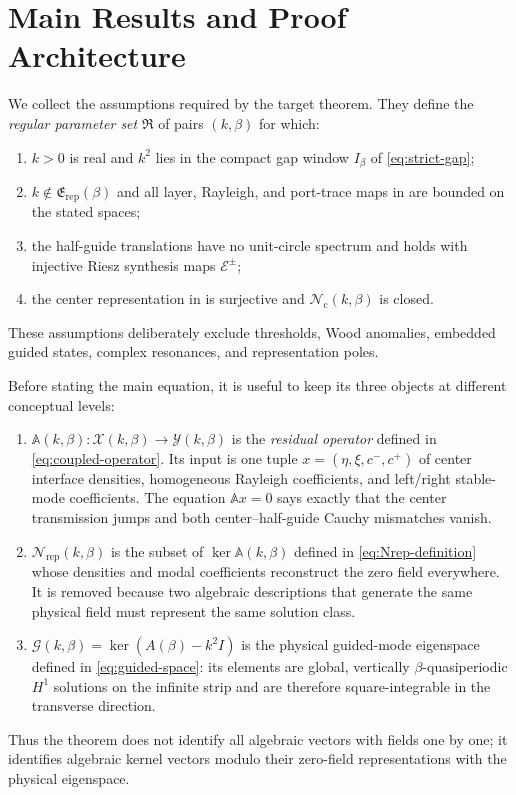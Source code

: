 \section{Main Results and Proof Architecture}
\label{sec:main-results}

We collect the assumptions required by the target theorem.  They define the
\emph{regular parameter set} $\mathfrak R$ of pairs $(k,\beta)$ for which:
\begin{enumerate}[label=(R\arabic*),leftmargin=2.8em]
  \item $k>0$ is real and $k^2$ lies in the compact gap window
  $I_\beta$ of \eqref{eq:strict-gap};
  \item $k\notin\mathfrak E_{\mathrm{rep}}(\beta)$ and all layer, Rayleigh,
  and port-trace maps in  are bounded on the stated
  spaces;
  \item the half-guide translations have no unit-circle spectrum and
   holds with injective Riesz synthesis maps
  $\mathcal E^\pm$;
  \item the center representation in  is
  surjective and $\mathcal N_{\mathrm c}(k,\beta)$ is closed.
\end{enumerate}
These assumptions deliberately exclude thresholds, Wood anomalies, embedded
guided states, complex resonances, and representation poles.

Before stating the main equation, it is useful to keep its three objects at
different conceptual levels:
\begin{enumerate}[label=(\alph*),leftmargin=2.2em]
  \item $\mathbb A(k,\beta):\mathcal X(k,\beta)\to\mathcal Y(k,\beta)$ is the
  \emph{residual operator} defined in \eqref{eq:coupled-operator}.  Its input
  is one tuple $x=(\eta,\xi,c^-,c^+)$ of center interface densities,
  homogeneous Rayleigh coefficients, and left/right stable-mode
  coefficients.  The equation $\mathbb A x=0$ says exactly that the center
  transmission jumps and both center--half-guide Cauchy mismatches vanish.
  \item $\mathcal N_{\mathrm{rep}}(k,\beta)$ is the subset of
  $\ker\mathbb A(k,\beta)$ defined in \eqref{eq:Nrep-definition} whose
  densities and modal coefficients reconstruct the zero field everywhere.
  It is removed because two algebraic descriptions that generate the same
  physical field must represent the same solution class.
  \item $\mathcal G(k,\beta)=\ker(A(\beta)-k^2I)$ is the physical guided-mode
  eigenspace defined in \eqref{eq:guided-space}: its elements are global,
  vertically $\beta$-quasiperiodic $H^1$ solutions on the infinite strip and
  are therefore square-integrable in the transverse direction.
\end{enumerate}
Thus the theorem does not identify all algebraic vectors with fields one by
one; it identifies algebraic kernel vectors modulo their zero-field
representations with the physical eigenspace.

